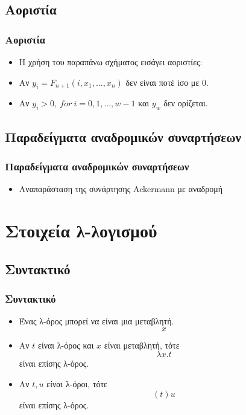 \documentclass{beamer}
\begin{document}
\subsection{Αοριστία}

\begin{frame}
        \frametitle{Αοριστία}
        \begin{itemize}
    	    \item Η χρήση του παραπάνω σχήματος εισάγει αοριστίες:
    	    \pause
            \item Αν \( y_i = F_{n+1}(i, x_1,\ldots, x_n) \) δεν είναι ποτέ ίσο με \( 0 \).
            \pause
            \item Αν \( y_i > 0,\:for\:i=0,1,\ldots,w-1 \) και \( y_w \) δεν ορίζεται.
        \end{itemize}
\end{frame}

\subsection{Παραδείγματα αναδρομικών συναρτήσεων}

\begin{frame}
        \frametitle{Παραδείγματα αναδρομικών συναρτήσεων}
        \begin{itemize}
                \item Αναπαράσταση της συνάρτησης Ackermann με αναδρομή
        \end{itemize}
\end{frame}

\section{Στοιχεία λ-λογισμού}

\subsection{Συντακτικό}

\begin{frame}
        \frametitle{Συντακτικό}
        \begin{itemize}
                \item Ένας λ-όρος μπορεί να είναι μια μεταβλητή.\[x\]
                \pause
                \item Αν \(t\) είναι λ-όρος και \(x\) είναι μεταβλητή, τότε \[\lambda x . t\]
                είναι επίσης λ-όρος.
                \pause
                \item Αν \(t, u\) είναι λ-όροι, τότε \[(t)u\]
                είναι επίσης λ-όρος.
        \end{itemize}
\end{frame}
\end{document}
